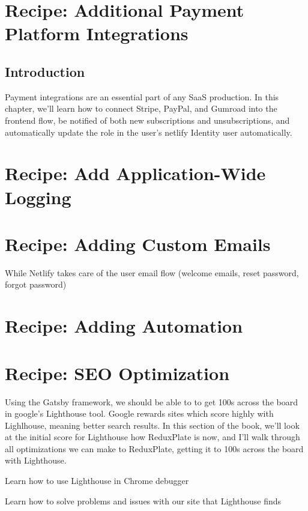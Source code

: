 \documentclass[a4paper,headinclude=on,footinclude=on,12pt,oneside]{scrbook}
\begin{document}
\chapter{Recipe: Additional Payment Platform Integrations}

\section{Introduction}

Payment integrations are an essential part of any SaaS production. In this chapter, we'll learn how to connect Stripe, PayPal, and Gumroad into the frontend flow, be notified of both new subscriptions and unsubscriptions, and automatically update the role in the user's netlify Identity user automatically.

\chapter{Recipe: Add Application-Wide Logging}

\chapter{Recipe: Adding Custom Emails}

While Netlify takes care of the user email flow (welcome emails, reset password, forgot password)

\chapter{Recipe: Adding Automation}

\chapter{Recipe: SEO Optimization}


Using the Gatsby framework, we should be able to to get 100s across the board in google's Lighthouse tool. Google rewards sites which score highly with Lighlhouse, meaning better search results. In this section of the book, we'll look at the initial score for Lighthouse how ReduxPlate is now, and I'll walk through all optimizations we can make to ReduxPlate, getting it to 100s across the board with Lighthouse.

\begin{arrows}
\item Learn how to use Lighthouse in Chrome debugger
\item Learn how to solve problems and issues with our site that Lighthouse finds
\end{arrows}
\end{document}
